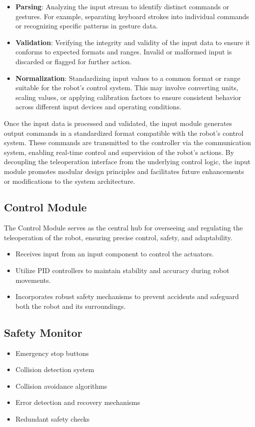 \documentclass{article}
\begin{document}
\begin{itemize}
    \item \textbf{Parsing}: Analyzing the input stream to identify distinct commands or gestures. For example, separating keyboard strokes into individual commands or recognizing specific patterns in gesture data.
    \item \textbf{Validation}: Verifying the integrity and validity of the input data to ensure it conforms to expected formats and ranges. Invalid or malformed input is discarded or flagged for further action.
    \item \textbf{Normalization}: Standardizing input values to a common format or range suitable for the robot's control system. This may involve converting units, scaling values, or applying calibration factors to ensure consistent behavior across different input devices and operating conditions.
\end{itemize}
Once the input data is processed and validated, the input module generates output commands in a standardized format compatible with the robot's control system. These commands are transmitted to the controller via the communication system, enabling real-time control and supervision of the robot's actions. By decoupling the teleoperation interface from the underlying control logic, the input module promotes modular design principles and facilitates future enhancements or modifications to the system architecture.

\subsection{Control Module}
The Control Module serves as the central hub for overseeing and regulating the teleoperation of the robot, ensuring precise control, safety, and adaptability.
\begin{itemize}
    \item Receives input from an input component to control the actuators.
    \item Utilize PID controllers to maintain stability and accuracy during robot movements.
    \item Incorporates robust safety mechanisms to prevent accidents and safeguard both the robot and its surroundings.
\end{itemize}

\subsection{Safety Monitor}
\begin{itemize}
    \item Emergency stop buttons
    \item Collision detection system
    \item Collision avoidance algorithms
    \item Error detection and recovery mechanisms
    \item Redundant safety checks
\end{itemize}
\end{document}
